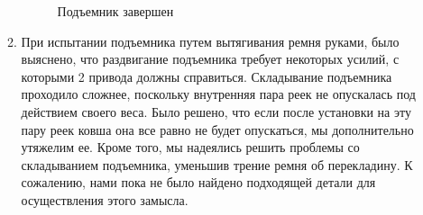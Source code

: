\begin{enumerate}
\begin{enumerate}
      \begin{figure}[H]
      	\begin{minipage}[h]{1\linewidth}
      		\caption{Подъемник завершен}
      	\end{minipage}
      \end{figure}
      
      \item	При испытании подъемника путем вытягивания ремня руками, было выяснено, что раздвигание подъемника требует некоторых усилий, с которыми 2 привода должны справиться. Складывание подъемника проходило сложнее, поскольку внутренняя пара реек не опускалась под действием своего веса. Было решено, что если после установки на эту пару реек ковша она все равно не будет опускаться, мы дополнительно утяжелим ее. Кроме того, мы надеялись решить проблемы со складыванием подъемника, уменьшив трение ремня об перекладину. К сожалению, нами пока не было найдено подходящей детали для осуществления этого замысла.
      

\end{enumerate}
\end{enumerate}
